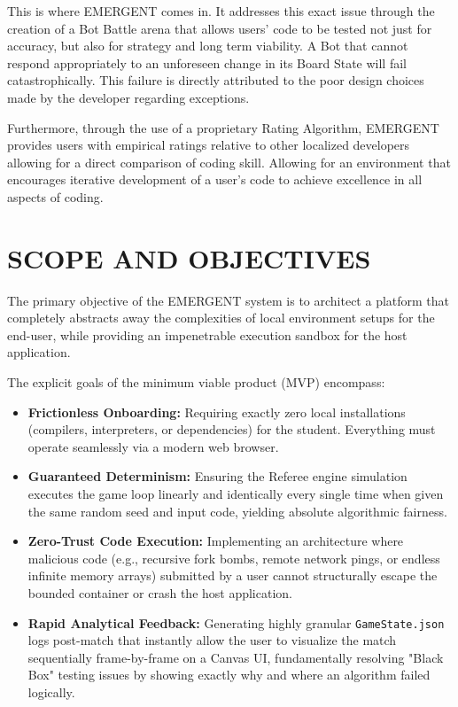 \documentclass[12pt,a4paper]{report}
\begin{document}
This is where EMERGENT comes in. It addresses this exact issue through the creation of a Bot Battle arena that allows users' code to be tested not just for accuracy, but also for strategy and long term viability. A Bot that cannot respond appropriately to an unforeseen change in its Board State will fail catastrophically. This failure is directly attributed to the poor design choices made by the developer regarding exceptions.

Furthermore, through the use of a proprietary Rating Algorithm, EMERGENT provides users with empirical ratings relative to other localized developers allowing for a direct comparison of coding skill. Allowing for an environment that encourages iterative development of a user's code to achieve excellence in all aspects of coding.

\section{SCOPE AND OBJECTIVES}
The primary objective of the EMERGENT system is to architect a platform that completely abstracts away the complexities of local environment setups for the end-user, while providing an impenetrable execution sandbox for the host application. 

The explicit goals of the minimum viable product (MVP) encompass:
\begin{itemize}
    \item \textbf{Frictionless Onboarding:} Requiring exactly zero local installations (compilers, interpreters, or dependencies) for the student. Everything must operate seamlessly via a modern web browser.
    \item \textbf{Guaranteed Determinism:} Ensuring the Referee engine simulation executes the game loop linearly and identically every single time when given the same random seed and input code, yielding absolute algorithmic fairness.
    \item \textbf{Zero-Trust Code Execution:} Implementing an architecture where malicious code (e.g., recursive fork bombs, remote network pings, or endless infinite memory arrays) submitted by a user cannot structurally escape the bounded container or crash the host application.
    \item \textbf{Rapid Analytical Feedback:} Generating highly granular \texttt{GameState.json} logs post-match that instantly allow the user to visualize the match sequentially frame-by-frame on a Canvas UI, fundamentally resolving "Black Box" testing issues by showing exactly why and where an algorithm failed logically.
\end{itemize}
\end{document}
